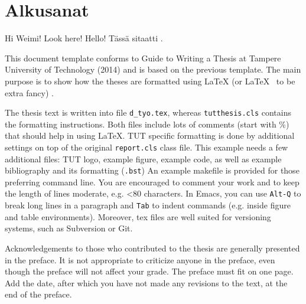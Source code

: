 \documentclass[12pt,a4paper,finnish]{tutthesis}
\begin{document}



\makeatother %

\chapter*{Alkusanat}

Hi Weimi! Look here! Hello! Tässä sitaatti \parencite{muelaner2015hybrid}.

This document template conforms to Guide to Writing a Thesis at
Tampere University of Technology (2014) and is based on the previous
template. The main purpose is to show how the theses are formatted
using LaTeX (or \LaTeX ~ to be extra fancy) .

The thesis text is written into file \texttt{d\_tyo.tex}, whereas
\texttt{tutthesis.cls} contains the formatting instructions. Both
files include lots of comments (start with \%) that should help in
using LaTeX. TUT specific formatting is done by additional settings on
top of the original \texttt{report.cls} class file. This example needs a
few additional files: TUT logo, example figure, example code, as well
as example bibliography and its formatting (\texttt{.bst}) An example
makefile is provided for those preferring command line. You are
encouraged to comment your work and to keep the length of lines
moderate, e.g. <80 characters. In Emacs, you can use \texttt{Alt-Q} to
break long lines in a paragraph and \texttt{Tab} to indent commands
(e.g. inside figure and table environments). Moreover, tex files are
well suited for versioning systems, such as Subversion or Git.  


Acknowledgements to those who contributed to the thesis are generally
presented in the preface. It is not appropriate to criticize anyone in
the preface, even though the preface will not affect your grade. The
preface must fit on one page. Add the date, after which you have not
made any revisions to the text, at the end of the preface.
\end{document}
